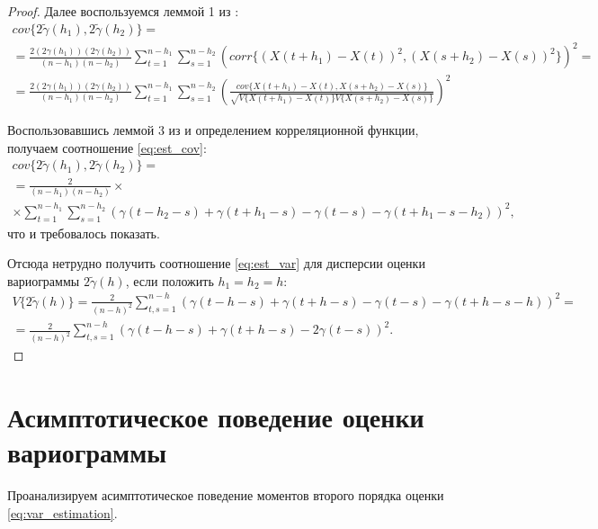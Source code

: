 \begin{proof}
Далее воспользуемся леммой 1 из \cite{tsekhavaya-brest}:
\begin{multline*}
	cov\{ 2 \tilde{\gamma}(h_1), 2 \tilde{\gamma}(h_2) \} = \\
	= \frac{2 (2\gamma(h_1))(2\gamma(h_2))}{(n - h_1)(n - h_2)} \sum_{t = 1}^{n - h_1}\sum_{s = 1}^{n - h_2} (corr\{(X(t + h_1) - X(t))^2, (X(s + h_2) - X(s))^2 \})^2 = \\
	= \frac{2 (2\gamma(h_1))(2\gamma(h_2))}{(n - h_1)(n - h_2)}\sum_{t = 1}^{n - h_1}\sum_{s = 1}^{n - h_2} ( \frac{cov\{ X(t + h_1) - X(t), X(s + h_2) - X(s) \}}{\sqrt{V\{ X( t + h_1) - X(t) \} V\{ X(s + h_2) - X(s) \}}} )^2
\end{multline*}

Воспользовавшись леммой 3 из \cite{tsekhavaya-brest} и определением корреляционной функции, получаем соотношение \eqref{eq:est_cov}:
\begin{eqnarray}
\nonumber
\label{eq:cov_base}
	cov\{ 2 \tilde{\gamma}(h_1), 2 \tilde{\gamma}(h_2) \} = \\
	= \frac{2}{(n - h_1)(n - h_2)} \times \\
	\times \sum_{t = 1}^{n - h_1}\sum_{s = 1}^{n - h_2} (\gamma(t - h_2 - s) + \gamma(t + h_1 - s) - \gamma(t - s) - \gamma(t + h_1 - s - h_2))^2,
\end{eqnarray}
что и требовалось показать.


Отсюда нетрудно получить соотношение \eqref{eq:est_var} для дисперсии оценки вариограммы $ 2 \tilde{\gamma}(h) $, если положить $ h_1 = h_2 = h $:
\begin{multline*}
\nonumber
	V \{ 2 \tilde{\gamma}(h) \} = \frac{2}{(n - h)^2}\sum_{t,s = 1}^{n - h} ( \gamma(t - h - s) + \gamma(t + h - s) - \gamma(t - s) - \gamma(t + h - s - h) )^2 = \\
	= \frac{2}{(n-h)^2}\sum_{t,s = 1}^{n - h} ( \gamma(t - h - s) + \gamma(t + h - s) - 2\gamma(t - s) )^2.
\end{multline*}

\end{proof}

\section{Асимптотическое поведение оценки вариограммы} %
\label{sec:new_section}

Проанализируем асимптотическое поведение моментов второго порядка оценки \eqref{eq:var_estimation}.

